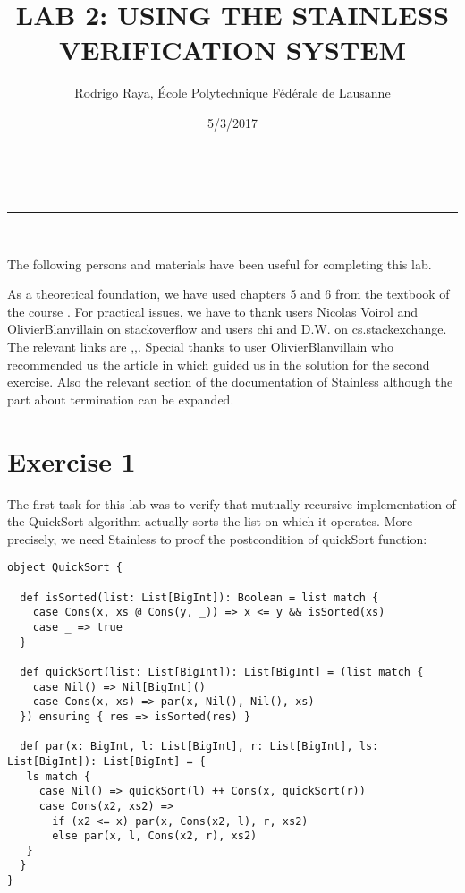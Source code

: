 \documentclass[a4paper,11pt]{article}
\makeatletter
\newcommand{\linia}{\rule{\linewidth}{0.5pt}}
\theoremstyle{mytheor}
\renewcommand{\maketitle}{
\begin{center}
\vspace{2ex}
{\huge \textsc{\@title}}
\vspace{1ex}
\\
\linia\\
\@author \hfill \@date
\vspace{4ex}
\end{center}
}
\makeatother
\begin{document}
\title{LAB 2: USING THE STAINLESS VERIFICATION SYSTEM}

\author{Rodrigo Raya, École Polytechnique Fédérale de Lausanne}

\date{5/3/2017}

\maketitle

The following persons and materials have been useful for completing this lab. 

As a theoretical foundation, we have used chapters 5 and 6 from the textbook of the course \cite{calculus-of-computation}. For practical issues, we have to thank users Nicolas Voirol and OlivierBlanvillain on stackoverflow and users chi and D.W. on cs.stackexchange. The relevant links are \cite{concatenation},\cite{forall},\cite{typeannotations}. Special thanks to user OlivierBlanvillain who recommended us the article in \cite{typearticle} which guided us in the solution for the second exercise. Also the relevant section of the documentation of Stainless \cite{termination} although the part about termination can be expanded. 

\section*{Exercise 1}

The first task for this lab was to verify that mutually recursive implementation of the QuickSort algorithm actually sorts the list on which it operates. More precisely, we need Stainless to proof the postcondition of quickSort function:


\begin{lstlisting}[label={list:first},caption=Original implementation to verify]
object QuickSort {
 
  def isSorted(list: List[BigInt]): Boolean = list match {
    case Cons(x, xs @ Cons(y, _)) => x <= y && isSorted(xs)
    case _ => true
  }
 
  def quickSort(list: List[BigInt]): List[BigInt] = (list match {
    case Nil() => Nil[BigInt]()
    case Cons(x, xs) => par(x, Nil(), Nil(), xs)
  }) ensuring { res => isSorted(res) }
 
  def par(x: BigInt, l: List[BigInt], r: List[BigInt], ls: List[BigInt]): List[BigInt] = {
   ls match {
     case Nil() => quickSort(l) ++ Cons(x, quickSort(r))
     case Cons(x2, xs2) => 
       if (x2 <= x) par(x, Cons(x2, l), r, xs2) 
       else par(x, l, Cons(x2, r), xs2)
   }
  }
}
\end{lstlisting}
\end{document}
